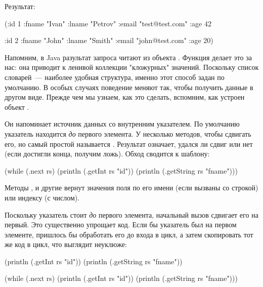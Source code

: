 Результат:

\begin{english}
  \begin{clojure}
({:id 1
  :fname "Ivan"
  :lname "Petrov"
  :email "test@test.com"
  :age 42}

 {:id 2
  :fname "John"
  :lname "Smith"
  :email "john@test.com"
  :age 20})
  \end{clojure}
\end{english}

Напомним, в Java разультат запроса читают из объекта . Функция  делает это за нас: она приводит  к ленивой коллекции "кложурных" значений. Поскольку список словарей~--- наиболее удобная структура, именно этот способ задан по умолчанию. В особых случаях поведение  меняют так, чтобы получить данные в другом виде. Прежде чем мы узнаем, как это сделать, вспомним, как устроен объект .

Он напоминает источник данных со внутренним указателем. По умолчанию указатель находится \emph{до} первого элемента. У  несколько методов, чтобы сдвигать его, но самый простой называется . Результат означает, удался ли сдвиг или нет (если достигли конца, получим ложь). Обход  сводится к шаблону:

\begin{english}
  \begin{clojure}
(while (.next rs)
  (println (.getInt rs "id"))
  (println (.getString rs "fname")))
  \end{clojure}
\end{english}

Методы ,  и другие вернут значения поля по его имени (если вызваны со строкой) или индексу (с числом).

Поскольку указатель стоит \emph{до} первого элемента, начальный вызов  сдвигает его на первый. Это существенно упрощает код. Если бы указатель был на первом элементе, пришлось бы обработать его до входа в цикл, а затем скопировать тот же код в цикл, что выглядит неуклюже:

\begin{english}
  \begin{clojure}
(println (.getInt rs "id"))
(println (.getString rs "fname"))

(while (.next rs)
  (println (.getInt rs "id"))
  (println (.getString rs "fname")))
  \end{clojure}
\end{english}

